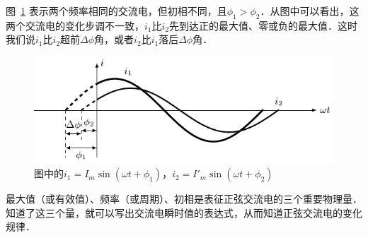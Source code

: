 图~\ref{fig_C_3-8} 表示两个频率相同的交流电，但初相不同，且$\phi_1>\phi_2$．从图中可以看出，这两个交流电的变化步调不一致，$i_1$比$i_2$先到达正的最大值、零或负的最大值．这时我们说$i_1$比$i_2$超前$\Delta\phi$角，或者$i_2$比$i_1$落后$\Delta\phi$角．
\begin{figure}[htbp]
    \centering
    \includegraphics{fig/C/3-8.pdf}
    \caption{图中的$i_1=I_m\sin(\omega t+\phi_1)$，$i_2=I'_m\sin(\omega t+\phi_2)$}\label{fig_C_3-8}
\end{figure}

最大值（或有效值）、频率（或周期）、初相是表征正弦交流电的三个重要物理量．
知道了这三个量，就可以写出交流电瞬时值的表达式，从而知道正弦交流电的变化规律．

